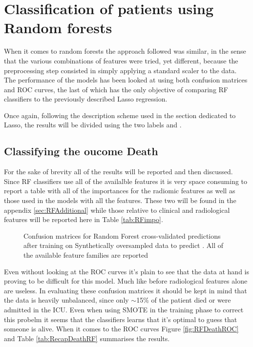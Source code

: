 \section{Classification of patients using Random forests}
When it comes to random forests the approach followed was similar, in the sense that the various combinations of features were tried, yet different, because the preprocessing step consisted in simply applying a standard scaler to the data.
The performance of the models has been looked at using both confusion matrices and ROC curves, the last of which has the only objective of comparing RF classifiers to the previously described Lasso regression. 

Once again, following the description scheme used in the section dedicated to Lasso, the results will be divided using the two labels \icu and \death.

\subsection{Classifying the oucome Death}
For the sake of brevity all of the results will be reported and then discussed. Since RF classifiers use all of the availalble features it is very space consuming to report a table with all of the importances for the radiomic features as well as those used in the models with all the features. These two will be found in the appendix \ref{sec:RFAdditional} while those relative to clinical and radiological features will be reported here in Table \ref{tab:RFimpo}.

\begin{figure}[H]
\centering
	\newline
        \caption{Confusion matrices for Random Forest cross-validated predictions after training on Synthetically oversampled data to predict \death. All of the available feature families are reported}\label{fig:RFDeath}
\end{figure}

Even without looking at the ROC curves it's plain to see that the data at hand is proving to be difficult for this model. Much like before radiological features alone are useless.
In evaluating these confusion matrices it should be kept in mind that the data is heavily unbalanced, since only $\sim$15\% of the patient died or were admitted in the ICU.
Even when using SMOTE in the training phase to correct this probelm it seems that the classifiers learns that it's optimal to guess that someone is alive. When it comes to the ROC curves Figure \ref{fig:RFDeathROC} and Table \ref{tab:RecapDeathRF} summarises the results.


